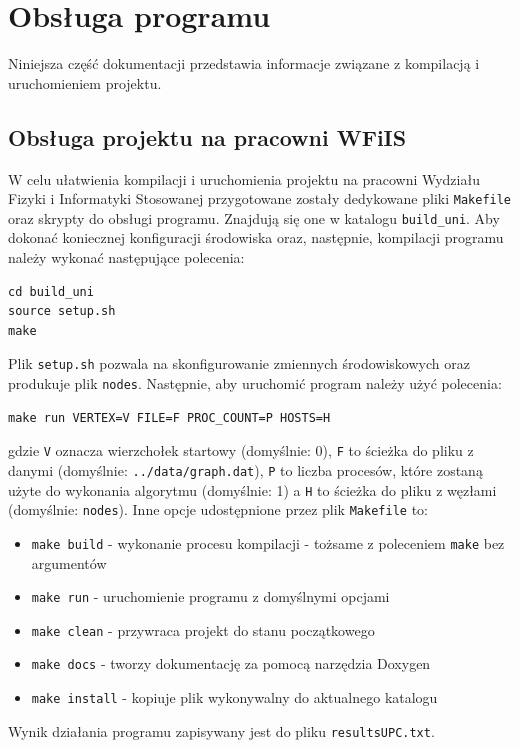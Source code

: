 \documentclass[12pt]{article}
\begin{document}
\clearpage
\section{Obsługa programu}
Niniejsza część dokumentacji przedstawia informacje związane z kompilacją i uruchomieniem projektu.

\subsection{Obsługa projektu na pracowni WFiIS}
\label{sec:doxy}
W celu ułatwienia kompilacji i uruchomienia projektu na pracowni Wydziału Fizyki i Informatyki Stosowanej przygotowane zostały dedykowane pliki \lstinline{Makefile} oraz skrypty do obsługi programu. Znajdują się one w katalogu \lstinline{build_uni}. Aby dokonać koniecznej konfiguracji środowiska oraz, następnie, kompilacji programu należy wykonać następujące polecenia:
\begin{lstlisting}
cd build_uni
source setup.sh
make
\end{lstlisting}
Plik \lstinline{setup.sh} pozwala na skonfigurowanie zmiennych środowiskowych oraz produkuje plik \lstinline{nodes}. Następnie, aby uruchomić program należy użyć polecenia:
\begin{lstlisting}
make run VERTEX=V FILE=F PROC_COUNT=P HOSTS=H
\end{lstlisting}
gdzie \lstinline{V} oznacza wierzchołek startowy (domyślnie: 0), \lstinline{F} to ścieżka do pliku z danymi (domyślnie: \lstinline{../data/graph.dat}), \lstinline{P} to liczba procesów, które zostaną użyte do wykonania algorytmu (domyślnie: 1) a \lstinline{H} to ścieżka do pliku z węzłami (domyślnie: \lstinline{nodes}). Inne opcje udostępnione przez plik \lstinline{Makefile} to:
\begin{itemize}
\item \lstinline{make build} - wykonanie procesu kompilacji - tożsame z poleceniem \lstinline{make} bez argumentów
\item \lstinline{make run} - uruchomienie programu z domyślnymi opcjami
\item \lstinline{make clean} - przywraca projekt do stanu początkowego
\item \lstinline{make docs} - tworzy dokumentację za pomocą narzędzia Doxygen
\item \lstinline{make install} - kopiuje plik wykonywalny do aktualnego katalogu
\end{itemize}
Wynik działania programu zapisywany jest do pliku \lstinline{resultsUPC.txt}.
\end{document}
